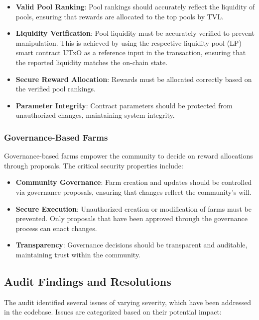 \documentclass{article}
\begin{document}
\begin{itemize}
    \item \textbf{Valid Pool Ranking}: Pool rankings should accurately reflect the liquidity of pools, ensuring that rewards are allocated to the top pools by TVL.
    \item \textbf{Liquidity Verification}: Pool liquidity must be accurately verified to prevent manipulation. This is achieved by using the respective liquidity pool (LP) smart contract UTxO as a reference input in the transaction, ensuring that the reported liquidity matches the on-chain state.
    \item \textbf{Secure Reward Allocation}: Rewards must be allocated correctly based on the verified pool rankings.
    \item \textbf{Parameter Integrity}: Contract parameters should be protected from unauthorized changes, maintaining system integrity.
\end{itemize}

\subsubsection{Governance-Based Farms}

Governance-based farms empower the community to decide on reward allocations through proposals. The critical security properties include:

\begin{itemize}
    \item \textbf{Community Governance}: Farm creation and updates should be controlled via governance proposals, ensuring that changes reflect the community's will.
    \item \textbf{Secure Execution}: Unauthorized creation or modification of farms must be prevented. Only proposals that have been approved through the governance process can enact changes.
    \item \textbf{Transparency}: Governance decisions should be transparent and auditable, maintaining trust within the community.
\end{itemize}

\subsection{Audit Findings and Resolutions}

The audit identified several issues of varying severity, which have been addressed in the codebase. Issues are categorized based on their potential impact:
\end{document}

